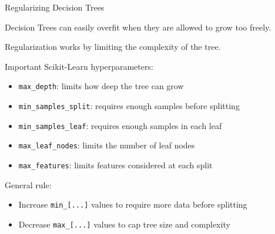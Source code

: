 \documentclass[aspectratio=169]{beamer}
\begin{document}
\begin{frame}{Regularizing Decision Trees}
	
	Decision Trees can easily overfit when they are allowed to grow too freely.
	
	\vspace{0.5em}
	
	Regularization works by limiting the complexity of the tree.
	
	\vspace{0.5em}
	
	Important Scikit-Learn hyperparameters:
	
	\begin{itemize}
		\item \texttt{max\_depth}: limits how deep the tree can grow
		\item \texttt{min\_samples\_split}: requires enough samples before splitting
		\item \texttt{min\_samples\_leaf}: requires enough samples in each leaf
		\item \texttt{max\_leaf\_nodes}: limits the number of leaf nodes
		\item \texttt{max\_features}: limits features considered at each split
	\end{itemize}
	
	\vspace{0.5em}
	
	General rule:
	
	\begin{itemize}
		\item Increase \texttt{min\_[...]} values to require more data before splitting
		\item Decrease \texttt{max\_[...]} values to cap tree size and complexity
	\end{itemize}
	
\end{frame}

\end{document}
